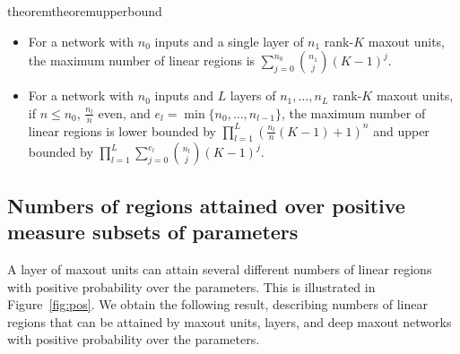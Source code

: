 \documentclass{article}
\theoremstyle{definition}
\begin{document}
\begin{restatable}{theorem}{theoremupperbound}
\label{thm:upper_bound}
\hspace{1em}
\begin{itemize}[leftmargin=*]
    \item
For a network with $n_0$ inputs and a single layer of $n_1$ rank-$K$ maxout units, the maximum number of linear regions is $\sum_{j=0}^{n_0}\binom{n_1}{j}(K-1)^j$.
\item 
For a network with $n_0$ inputs and $L$ layers of $n_1,\ldots, n_L$ rank-$K$ maxout units, if $n\leq n_0$, $\frac{n_l}{n}$ even, and $e_l = \min\{n_0,\ldots, n_{l-1}\}$, the maximum number of linear regions is lower bounded by $\prod_{l=1}^{L} (\frac{n_l}{n} (K-1)+1)^n$ and upper bounded by $\prod_{l=1}^L \sum_{j=0}^{e_l} \binom{n_l}{j} (K-1)^j$.
\end{itemize}
\end{restatable} 

\subsection{Numbers of regions attained over positive measure subsets of parameters}

A layer of maxout units can attain several different numbers of linear regions with positive probability over the parameters. This is illustrated in Figure~\ref{fig:pos}. 
We obtain the following result, describing numbers of linear regions that can be attained by maxout units, layers, and deep maxout networks with positive probability over the parameters. 
\end{document}
